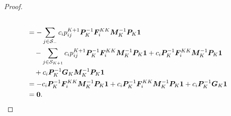 \begin{proof}
\begin{align*}
		\\&= -\sum_{j\in\mathcal{S}_-} c_ip_{ij}^{K+1} \boldsymbol P_K^{-1}\boldsymbol F_i^{KK}\boldsymbol M_K^{-1}\boldsymbol P_K \boldsymbol 1 
		\\&{}\quad-\sum_{j\in\mathcal{S}_{{K+1}}}c_ip_{ij}^{K+1} \boldsymbol P_K^{-1}\boldsymbol F_i^{KK}\boldsymbol M_K^{-1}\boldsymbol P_K\boldsymbol 1+ c_i \boldsymbol P_K^{-1}\boldsymbol F_i^{KK}\boldsymbol M_K^{-1}\boldsymbol P_K\boldsymbol 1
		\\&\quad{}+ c_i \boldsymbol P_K^{-1}\boldsymbol G_K\boldsymbol M_K^{-1}\boldsymbol P_K\boldsymbol 1
		\\&= - c_i \boldsymbol P_K^{-1}\boldsymbol F_i^{KK}\boldsymbol M_K^{-1}\boldsymbol P_K \boldsymbol 1 + c_i \boldsymbol P_K^{-1}\boldsymbol F_i^{KK}\boldsymbol M_K^{-1}\boldsymbol P_K\boldsymbol 1 + c_i \boldsymbol P_K^{-1}\boldsymbol G_K\boldsymbol 1
		\\&= \boldsymbol 0.
	\end{align*}


\end{proof}
